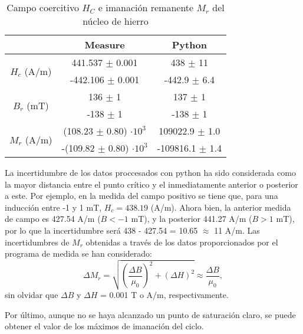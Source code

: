 \documentclass[fleqn,11pt]{SelfArx} %
\begin{document}
\begin{table}[htb!]
	\centering
	\begin{tabular}{c c c}
		\toprule
		& Measure & Python \\
		\midrule[0.7px]
		\multirow{2}{*}{$H_c$ (A/m)} & 441.537 $\pm$ 0.001 & 438 $\pm$ 11   \\
		& -442.106 $\pm$ 0.001 & -442.9 $\pm$ 6.4 \\
		\midrule
		\multirow{2}{*}{$B_r$ (mT)}& 136 $\pm$ 1 & 137 $\pm$ 1\\
		& -138 $\pm$ 1 & -138 $\pm$ 1 \\
		\midrule
		\multirow{2}{*}{$M_r$ (A/m)}& (108.23 $\pm$ 0.80) $\cdot 10^3$  & 109022.9 $\pm$ 1.0 \\
		& -(109.82  $\pm$ 0.80) $\cdot 10^3$  & -109816.1 $\pm$ 1.4  \\
		\bottomrule
	\end{tabular}
	\caption{Campo coercitivo $H_C$ e imanación remanente $M_r$ del núcleo de hierro}
	\label{remacitivo}
\end{table}

La incertidumbre de los datos proccesados con python ha sido considerada como la mayor distancia entre el punto crítico y el inmediatamente anterior o posterior a este. Por ejemplo, en la medida del campo positivo se tiene que, para una inducción entre -1 y 1 mT,  $H_c = 438.19$ (A/m). Ahora bien, la anterior medida de campo es  427.54 A/m ($B < -1$ mT), y la posterior 441.27 A/m ($B > 1$ mT), por lo que la incertidumbre será 438 - 427.54 = 10.65 $\approx$ 11 A/m. Las incertidumbres de $M_r$ obtenidas a través de los datos proporcionados por el programa de medida se han considerado:
\begin{equation}\label{incmr}
	\Delta M_r = \sqrt{\left(\frac{\Delta B}{\mu_0}\right)^2 + (\Delta H)^2} \approx \frac{\Delta B}{\mu_0},
\end{equation}
sin olvidar que $\Delta B$ y $\Delta H$ = 0.001 T o A/m, respectivamente.

Por último, aunque no se haya alcanzado un punto de saturación claro, se puede obtener el valor de los máximos de imanación del ciclo.
\end{document}

